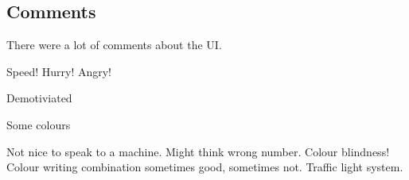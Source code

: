 \documentclass[main.tex]{subfiles}
\begin{document}
\subsection{Comments}
There were a lot of comments about the UI.

Speed!
Hurry!
Angry!

Demotiviated

Some colours

Not nice to speak to a machine. Might think wrong number. Colour blindness! Colour writing combination sometimes good, sometimes not. Traffic light system.
\end{document}
